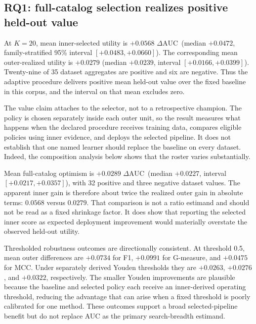 \documentclass[referee]{USG}
\newcommand{\dauc}{\ensuremath{\Delta\mathrm{AUC}}}
\begin{document}
\subsection{RQ1: full-catalog selection realizes positive held-out value}
At $K=20$, mean inner-selected utility is $+0.0568$ \dauc\ (median $+0.0472$, family-stratified 95\% interval $[+0.0483,+0.0660]$). The corresponding mean outer-realized utility is $+0.0279$ (median $+0.0239$, interval $[+0.0166,+0.0399]$). Twenty-nine of 35 dataset aggregates are positive and six are negative. Thus the adaptive procedure delivers positive mean held-out value over the fixed baseline in this corpus, and the interval on that mean excludes zero.

The value claim attaches to the selector, not to a retrospective champion. The policy is chosen separately inside each outer unit, so the result measures what happens when the declared procedure receives training data, compares eligible policies using inner evidence, and deploys the selected pipeline. It does not establish that one named learner should replace the baseline on every dataset. Indeed, the composition analysis below shows that the roster varies substantially.

Mean full-catalog optimism is $+0.0289$ \dauc\ (median $+0.0227$, interval $[+0.0217,+0.0357]$), with 32 positive and three negative dataset values. The apparent inner gain is therefore about twice the realized outer gain in absolute terms: $0.0568$ versus $0.0279$. That comparison is not a ratio estimand and should not be read as a fixed shrinkage factor. It does show that reporting the selected inner score as expected deployment improvement would materially overstate the observed held-out utility.

Thresholded robustness outcomes are directionally consistent. At threshold 0.5, mean outer differences are $+0.0734$ for F1, $+0.0991$ for G-measure, and $+0.0475$ for MCC. Under separately derived Youden thresholds they are $+0.0263$, $+0.0276$, and $+0.0322$, respectively. The smaller Youden improvements are plausible because the baseline and selected policy each receive an inner-derived operating threshold, reducing the advantage that can arise when a fixed threshold is poorly calibrated for one method. These outcomes support a broad selected-pipeline benefit but do not replace AUC as the primary search-breadth estimand.
\end{document}
